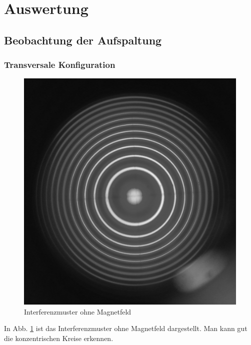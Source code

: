 \newpage

\section{Auswertung}
\subsection{Beobachtung der Aufspaltung}
\subsubsection{Transversale Konfiguration}
\begin{figure}
\centering
\includegraphics[scale=0.1]{data/bilder_okular/bild_1_edit.jpg}
\caption{Interferenzmuster ohne Magnetfeld}
\label{fig:bildtransohneB}
\end{figure}
In Abb. \ref{fig:bildtransohneB} ist das Interferenzmuster ohne Magnetfeld dargestellt. Man kann gut die konzentrischen Kreise erkennen.\\
